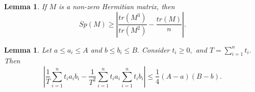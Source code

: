 \documentclass[10pt,a4paper,oneside]{article}
\newtheorem{lemma}[theorem]{Lemma}
\begin{document}
\begin{lemma}\cite{merikoski2003characterizations}\label{4.3}
If $M$ is a non-zero Hermitian matrix, then $$Sp(M)\geq \left\vert\dfrac{tr(M^3)}{tr(M^2)}-\dfrac{tr(M)}{n}\right \vert.$$
\end{lemma}
\begin{lemma}\cite{pachpatte2012analytic}\label{4.4}
Let $a\leq a_i\leq A$ and $b\leq b_i\leq B.$ Consider $t_i\geq 0,$ and $T=\sum\limits_{i=1}^{n}t_i.$ Then
$$\left\vert\dfrac{1}{T}\sum\limits_{i=1}^{n}t_ia_ib_i-\dfrac{1}{T^2}\sum\limits_{i=1}^{n}t_ia_i\sum\limits_{i=1}^{n}t_ib_i\right\vert \leq \dfrac{1}{4}(A-a)(B-b).$$
\end{lemma}






\end{document}
